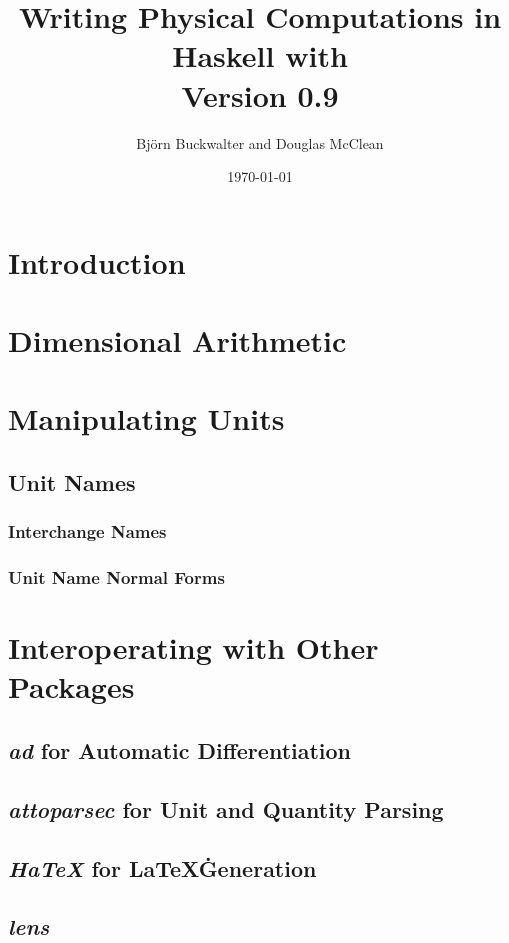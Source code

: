 \documentclass[12pt]{report}
\title{
	{Writing Physical Computations in Haskell with \packagename{dimensional-dk}}\\
	{\small{Version 0.9}}
}
\author{Björn Buckwalter and Douglas McClean}
\date{\today}
\newcommand{\packagename}[1]{\textit{#1}}
\begin{document}
\maketitle

\tableofcontents

\chapter{Introduction}

\chapter{Dimensional Arithmetic}

\chapter{Manipulating Units}

\section{Unit Names}

\subsection{Interchange Names}
\subsection{Unit Name Normal Forms}

\chapter{Interoperating with Other Packages}

\section{\packagename{ad} for Automatic Differentiation}
\section{\packagename{attoparsec} for Unit and Quantity Parsing}
\section{\packagename{HaTeX} for \LaTeX{}\. Generation}
\section{\packagename{lens}}
\end{document}
